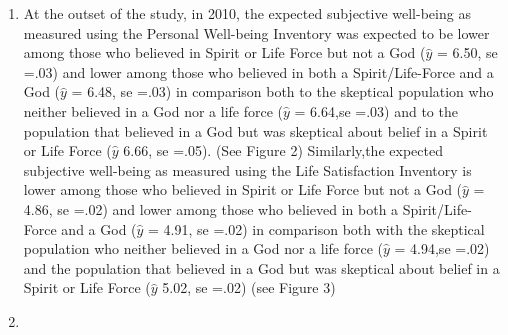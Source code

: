 \documentclass[
  english,
  man]{apa6}
\begin{document}
\begin{enumerate}
\def\labelenumi{\arabic{enumi}.}
\item
  At the outset of the study, in 2010, the expected subjective well-being as measured using the Personal Well-being Inventory was expected to be lower among those who believed in Spirit or Life Force but not a God (\(\hat{y}\) = 6.50, se =.03) and lower among those who believed in both a Spirit/Life-Force and a God (\(\hat{y}\) = 6.48, se =.03) in comparison both to the skeptical population who neither believed in a God nor a life force (\(\hat{y}\) = 6.64,se =.03) and to the population that believed in a God but was skeptical about belief in a Spirit or Life Force (\(\hat{y}\) 6.66, se =.05). (See Figure 2) Similarly,the expected subjective well-being as measured using the Life Satisfaction Inventory is lower among those who believed in Spirit or Life Force but not a God (\(\hat{y}\) = 4.86, se =.02) and lower among those who believed in both a Spirit/Life-Force and a God (\(\hat{y}\) = 4.91, se =.02) in comparison both with the skeptical population who neither believed in a God nor a life force (\(\hat{y}\) = 4.94,se =.02) and the population that believed in a God but was skeptical about belief in a Spirit or Life Force (\(\hat{y}\) 5.02, se =.02) (see Figure 3)
\item

\end{enumerate}
\end{document}
